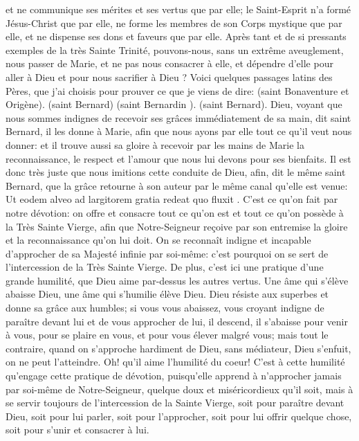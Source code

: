 et ne communique ses mérites et ses vertus que par elle; le Saint-Esprit n'a formé Jésus-Christ que par elle, ne
forme les membres de son Corps mystique que par elle, et ne dispense ses dons et faveurs que par elle. Après
tant et de si pressants exemples de la très Sainte Trinité, pouvons-nous, sans un extrême aveuglement, nous
passer de Marie, et ne pas nous consacrer à elle, et dépendre d'elle pour aller à Dieu et pour nous sacrifier à
Dieu ?
 Voici quelques passages latins des Pères, que j'ai choisis pour prouver ce que je viens de dire:  (saint
Bonaventure et Origène).
 (saint Bernard)
 (saint Bernardin ).
 (saint Bernard).
 Dieu, voyant que nous sommes indignes de recevoir ses grâces immédiatement de sa main, dit saint
Bernard, il les donne à Marie, afin que nous ayons par elle tout ce qu'il veut nous donner: et il trouve aussi sa
gloire à recevoir par les mains de Marie la reconnaissance, le respect et l'amour que nous lui devons pour ses
bienfaits. Il est donc très juste que nous imitions cette conduite de Dieu, afin, dit le même saint Bernard, que la
grâce retourne à son auteur par le même canal qu'elle est venue: Ut eodem alveo ad largitorem gratia redeat quo
fluxit .
C'est ce qu'on fait par notre dévotion: on offre et consacre tout ce qu'on est et tout ce qu'on possède à la Très
Sainte Vierge, afin que Notre-Seigneur reçoive par son entremise la gloire et la reconnaissance qu'on lui doit. On
se reconnaît indigne et incapable d'approcher de sa Majesté infinie par soi-même: c'est pourquoi on se sert de
l'intercession de la Très Sainte Vierge.
 De plus, c'est ici une pratique d'une grande humilité, que Dieu aime par-dessus les autres vertus. Une âme
qui s'élève abaisse Dieu, une âme qui s'humilie élève Dieu. Dieu résiste aux superbes et donne sa grâce aux
humbles; si vous vous abaissez, vous croyant indigne de paraître devant lui et de vous approcher de lui, il
descend, il s'abaisse pour venir à vous, pour se plaire en vous, et pour vous élever malgré vous; mais tout le
contraire, quand on s'approche hardiment de Dieu, sans médiateur, Dieu s'enfuit, on ne peut l'atteindre. Oh! qu'il
aime l'humilité du coeur! C'est à cette humilité qu'engage cette pratique de dévotion, puisqu'elle apprend à
n'approcher jamais par soi-même de Notre-Seigneur, quelque doux et miséricordieux qu'il soit, mais à se servir
toujours de l'intercession de la Sainte Vierge, soit pour paraître devant Dieu, soit pour lui parler, soit pour
l'approcher, soit pour lui offrir quelque chose, soit pour s'unir et consacrer à lui.
